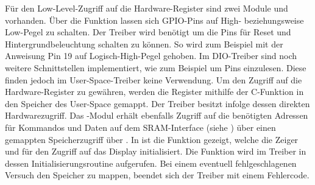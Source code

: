 Für den Low-Level-Zugriff auf die Hardware-Register sind zwei Module  und  vorhanden. Über die Funktion  lassen sich GPIO-Pins auf \linebreak High- beziehungsweise Low-Pegel zu schalten. Der Treiber wird benötigt um die Pins für Reset und Hintergrundbeleuchtung schalten zu können. So wird zum Beispiel mit der Anweisung  Pin 19 auf Logisch-High-Pegel gehoben.
Im DIO-Treiber sind noch weitere Schnittstellen implementiert, wie zum Beispiel  um Pins einzulesen. Diese finden jedoch im User-Space-Treiber keine Verwendung. Um den Zugriff auf die Hardware-Register zu gewähren, werden die Register mithilfe der C-Funktion  in den Speicher des User-Space gemappt. Der Treiber besitzt infolge dessen direkten Hardwarezugriff.
Das -Modul erhält ebenfalls Zugriff auf die benötigten Adressen für Kommandos und Daten auf dem SRAM-Interface (siehe ) über einen gemappten Speicherzugriff über . In  ist die Funktion  gezeigt, welche die Zeiger  und  für den Zugriff auf das Display initialisiert. Die Funktion wird im Treiber in dessen Initialisierungsroutine aufgerufen. Bei einem eventuell fehlgeschlagenen Versuch den Speicher zu mappen, beendet sich der Treiber mit einem Fehlercode.

